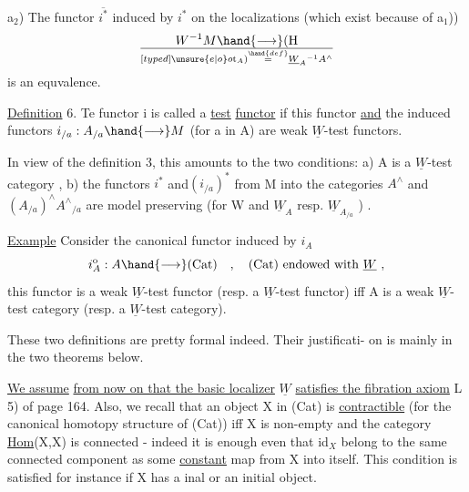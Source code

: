 
a$_2$) The functor $\overline{i^*}$ induced by $i^*$ on the localizations (which exist
because of a$_1$))
\[ W^{-1}M \hand{\longrightarrow} (\mathrm{H}\over[typed]{\unsure{e|o}}{o}\mathrm{t}_A) \overset{\hand{def}}{=} \underline{W}_A{}^{-1}A^{\wedge} \]
is an equvalence.

\uline{Definition} 6. Te functor i is called a \uline{test} \uline{functor} if this functor
\uline{and} the induced functors $i_{/a} : A_{/a} \hand{\longrightarrow} M$ (for a in A) are weak $\underline{W}$-test
functors.

In view of the definition 3, this amounts to the two conditions:
a) A is a $\underline{W}$-test category ,  
b) the functors $i^*$ and$(i_{/a})^*$ from M into the categories $A^{\wedge}$ and
$(A_{/a})^{\wedge}$\hand{$\xrightarrow{\approx}$}$A^{\wedge}{}_{/a}$ are model preserving (for W and $\underline{W}_A$ resp. $\underline{W}_{A_{/a}}$ ) .

\uline{Example} Consider the canonical functor induced by $i_A$ 
\[ i^{\mathrm{o}}_A : A \hand{\longrightarrow} (\mathrm{Cat}) \quad , \quad (\mathrm{Cat}) \text{ endowed with } \underline{W} \ , \]
this functor is a weak $\underline{W}$-test functor (resp. a $\underline{W}$-test functor) iff A is
a weak $\underline{W}$-test category (resp. a $\underline{W}$-test category).

These two definitions are pretty formal indeed. Their justificati-%
on is mainly in the two theorems below.

 \uline{We assume}  \uline{from now on that the basic localizer} $\underline{W}$
\uline{satisfies the fibration axiom} L 5) of page 164. Also, we recall
that an object X in (Cat) is \uline{contractible} (for the canonical
homotopy structure of (Cat)) iff X is non-empty and the category
\uline{Hom}(X,X) is connected - indeed it is enough even that id$_X$ belong to the
same connected component as some \uline{constant} map from X into itself. This
condition is satisfied for instance if X has a inal or an initial
object.

